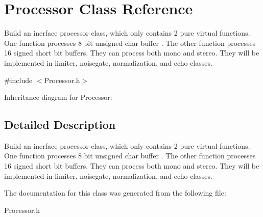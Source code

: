 \hypertarget{classProcessor}{}\section{Processor Class Reference}
\label{classProcessor}


Build an inerface processor class, which only contains 2 pure virtual functions. One function processes 8 bit unsigned char buffer . The other function processes 16 signed short bit buffers. They can process both mono and stereo. They will be implemented in limiter, noisegate, normalization, and echo classes.  




{\ttfamily \#include $<$Processor.\+h$>$}



Inheritance diagram for Processor\+:


\subsection{Detailed Description}
Build an inerface processor class, which only contains 2 pure virtual functions. One function processes 8 bit unsigned char buffer . The other function processes 16 signed short bit buffers. They can process both mono and stereo. They will be implemented in limiter, noisegate, normalization, and echo classes. 

The documentation for this class was generated from the following file\+:\begin{DoxyCompactItemize}
\item 
Processor.\+h\end{DoxyCompactItemize}

